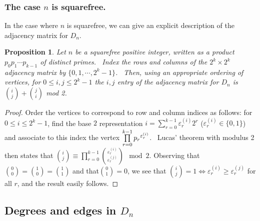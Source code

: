 \documentclass[11pt,a4paper]{amsart}
\newtheorem{prop}[thm]{Proposition}
\theoremstyle{definition}
\numberwithin{equation}{section}
\begin{document}
\subsubsection{The case $n$ is squarefree.}

In the case where $n$ is squarefree, we can give an explicit description of
the adjacency matrix for $D_{n}$. \ 

\begin{prop}
Let $n$ be a squarefree positive integer, written as a product $%
p_{0}p_{1}\cdots p_{k-1}$ of distinct primes. \ Index the rows and columns
of the $2^{k}\times 2^{k}$ adjacency matrix by $\{0,1,\cdots ,2^{k}-1\}$. \
Then, using an appropriate ordering of vertices,  for $0\leq i,j\leq 2^{k}-1
$ the $i,j$ entry of the adjacency matrix for $D_{n}$ is $\binom{i}{j}
+\binom{j}{i}$ mod 2. 
\end{prop}

\begin{proof}
Order the vertices to correspond to row and column indices as follows: for $%
0\leq i\leq 2^{k}-1$, find the base $2$ representation $i=\sum%
\limits_{r=0}^{k-1}\varepsilon^{(i)} _{r}2^{r}$ ($\varepsilon^{(i)} _{r}\in \{0,1\}$)
and associate to this index the vertex  $\prod\limits_{r=0}^{k-1}{p_r}^{%
\varepsilon^{(i)} _{r}}$. \  Lucas' theorem with modulus 2 then states that %
$\binom {i}{j} \equiv \prod\limits_{r=0}^{k-1} \binom{\varepsilon^{(i)}_r}{\varepsilon^{(j)}_r} \mod2.$  Observing that$\binom{0}{0}=\binom{1}{0}=\binom{1}{1}$ and that$\binom{0}{1}=0$, we see that $\binom{i}{j}=1 \iff \varepsilon^{(i)}_r \ge \varepsilon^{(j)}_r$  for all $r$, and the result easily follows.
\end{proof}

\bigskip








\subsection{Degrees and edges in $D_n$}
\end{document}
